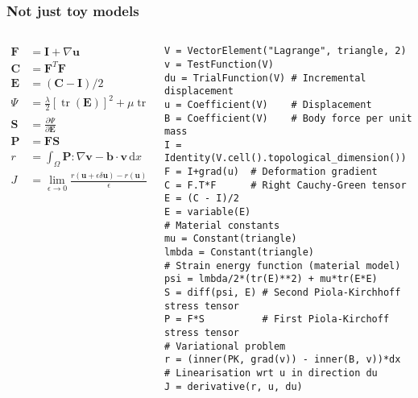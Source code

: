 \documentclass[presentation]{beamer}
\DeclareMathOperator{\tr}{tr}
\begin{document}
\begin{frame}[fragile]
  \frametitle{Not just toy models}
  \begin{columns}
    \begin{column}{0.4\textwidth}
      \begin{align*}
        \mathbf{F} &= \mathbf{I} + \nabla \mathbf{u}\\
        \mathbf{C} &= \mathbf{F}^T \mathbf{F}\\
        \mathbf{E} &= (\mathbf{C} - \mathbf{I}) / 2\\
        \Psi &= \frac{\lambda}{2}[\tr(\mathbf{E})]^2 + \mu \tr(\mathbf{E}^2)\\
        \mathbf{S} &= \frac{\partial \Psi}{\partial \mathbf{E}}\\
        \mathbf{P} &= \mathbf{F} \mathbf{S}\\
        r &= \int_\Omega \mathbf{P} : \nabla \mathbf{v} - \mathbf{b} \cdot \mathbf{v}\,\text{d}x\\
        J &= \lim_{\epsilon \to 0} \frac{r(\mathbf{u} + \epsilon \delta \mathbf{u}) - r(\mathbf{u})}{\epsilon}
      \end{align*}
    \end{column}
    \begin{column}{0.6\textwidth}
\begin{verbatim}
V = VectorElement("Lagrange", triangle, 2)
v = TestFunction(V)
du = TrialFunction(V) # Incremental displacement
u = Coefficient(V)    # Displacement
B = Coefficient(V)    # Body force per unit mass
I = Identity(V.cell().topological_dimension())
F = I+grad(u)  # Deformation gradient
C = F.T*F      # Right Cauchy-Green tensor
E = (C - I)/2
E = variable(E)
# Material constants
mu = Constant(triangle)
lmbda = Constant(triangle)
# Strain energy function (material model)
psi = lmbda/2*(tr(E)**2) + mu*tr(E*E)
S = diff(psi, E) # Second Piola-Kirchhoff stress tensor
P = F*S          # First Piola-Kirchoff stress tensor
# Variational problem
r = (inner(PK, grad(v)) - inner(B, v))*dx
# Linearisation wrt u in direction du
J = derivative(r, u, du)
\end{verbatim}
    \end{column}
  \end{columns}
\end{frame}
\end{document}
